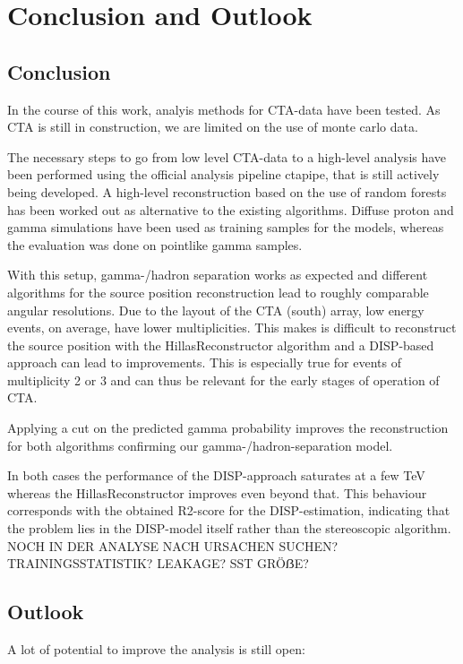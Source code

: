 
\chapter{Conclusion and Outlook}
\label{conclusion}

\section{Conclusion}
In the course of this work, analyis methods for CTA-data have been tested.
As CTA is still in construction, we are limited on the use of monte carlo data.

The necessary steps to go from low level CTA-data to a high-level analysis have been performed
using the official analysis pipeline ctapipe, that is still actively being developed.
A high-level reconstruction based on the use of random forests has been worked out as alternative
to the existing algorithms.
Diffuse proton and gamma simulations have been used as training samples for the models, 
whereas the evaluation was done on pointlike gamma samples.

With this setup, gamma-/hadron separation works as expected and different algorithms 
for the source position reconstruction lead to roughly comparable angular
resolutions.
Due to the layout of the CTA (south) array, low energy events, on average, have lower multiplicities.
This makes is difficult to reconstruct the source position with the HillasReconstructor 
algorithm and a DISP-based approach can lead to improvements. This is especially true for
events of multiplicity 2 or 3 and can thus be relevant for the early stages of operation of CTA.

Applying a cut on the predicted gamma probability improves the reconstruction for both
algorithms confirming our gamma-/hadron-separation model.

In both cases the performance of the DISP-approach saturates at a few \si{\tera\electronvolt}
whereas the HillasReconstructor improves even beyond that.
This behaviour corresponds with the obtained R2-score for the DISP-estimation, indicating 
that the problem lies in the DISP-model itself rather than the stereoscopic
algorithm. NOCH IN DER ANALYSE NACH URSACHEN SUCHEN? TRAININGSSTATISTIK? LEAKAGE? SST GRÖẞE?

\section{Outlook}
A lot of potential to improve the analysis is still open:

